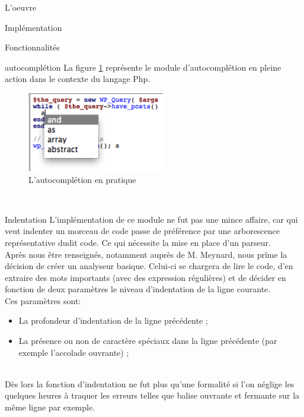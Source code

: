 \documentclass[a4paper, 12pt]{report}
\begin{document}
\begin{part}{L'oeuvre}
\begin{chapter}{Implémentation}
\begin{section}{Fonctionnalités}
\begin{subsection}{\Gls{autocomplétion}}
					La figure \ref{tabouret} représente le module d'\gls{autocomplétion} en pleine action dans le contexte du langage \gls{Php}.

					\begin{figure}[h]
						\begin{center}
							\includegraphics[width=6cm]{images/screenAutocmpl.png}
							\caption{L'autocomplétion en pratique}
							\label{tabouret}
						\end{center}
					\end{figure}~\\
				\end{subsection}
				\begin{subsection}{Indentation}
					L'implémentation de ce module ne fut pas une mince affaire, car qui veut indenter un morceau de code passe 
					de préférence par une arborescence représentative dudit code. Ce qui nécessite la mise en place d'un \gls{parseur}.\\
					Après nous être renseignés, notamment auprès de M. Meynard, nous prîme la décision de créer un analyseur basique. 
					Celui-ci se chargera de lire le code, d'en extraire des mots importants (avec des \glspl{expression régulière})
					et de décider en fonction de deux paramètres le niveau d'indentation de la ligne courante.\\
					Ces paramètres sont:
					\begin{itemize}
						\item La profondeur d'indentation de la ligne précédente ;
						\item La présence ou non de caractère spéciaux dans la ligne précédente (par exemple l'accolade ouvrante) ;
					\end{itemize}~\\

					Dès lors la fonction d'indentation ne fut plus qu'une formalité si l'on néglige les quelques heures à traquer les erreurs
					telles que balise ouvrante et fermante sur la même ligne par exemple.


\end{subsection}
\end{section}
\end{chapter}
\end{part}
\end{document}
